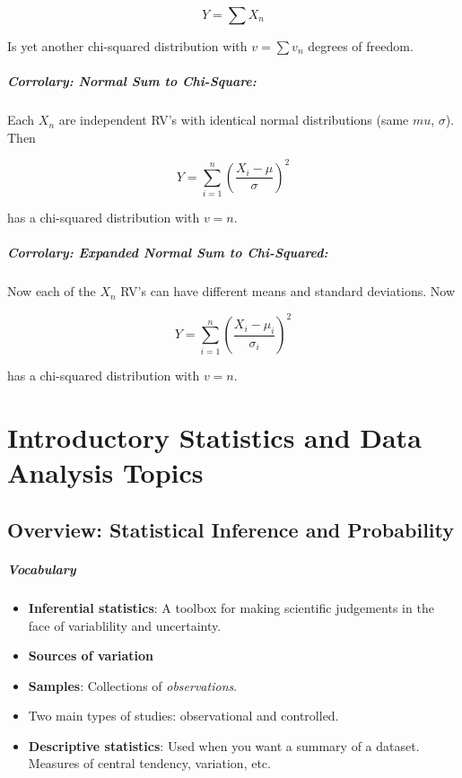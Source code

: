 \documentclass[a4paper,12pt]{report}
\begin{document}
$$Y = \sum X_n$$

Is yet another chi-squared distribution with $v = \sum v_n$ degrees of freedom. 

\paragraph{Corrolary: Normal Sum to Chi-Square: } Each $X_n$ are independent RV's with identical normal distributions (same $mu$, $\sigma$). Then 

$$Y = \sum_{i = 1}^{n} (\frac{X_i - \mu}{\sigma})^2$$

has a chi-squared distribution with $v = n$.

\paragraph{Corrolary: Expanded Normal Sum to Chi-Squared: } Now each of the $X_n$ RV's can have different means and standard deviations. Now 

$$Y = \sum_{i = 1}^{n} (\frac{X_i - \mu_i}{\sigma_i})^2$$

has a chi-squared distribution with $v = n$. 






\chapter{Introductory Statistics and Data Analysis Topics}

\section{Overview: Statistical Inference and Probability}

\paragraph{Vocabulary} 

\begin{itemize}
\item \textbf{Inferential statistics}: A toolbox for making scientific judgements in the face of variablility and uncertainty.
\item \textbf{Sources of variation} 
\item \textbf{Samples}: Collections of \textit{observations}. 
\item Two main types of studies: observational and controlled.
\item \textbf{Descriptive statistics}: Used when you want a summary of a dataset. Measures of central tendency, variation, etc.
\end{itemize}
\end{document}
